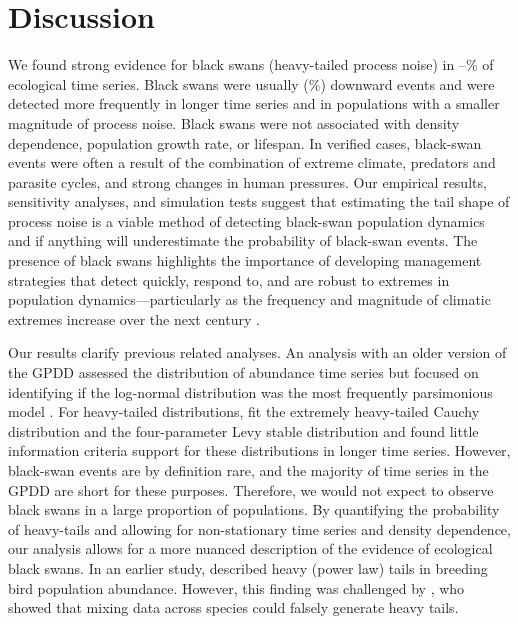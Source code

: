 \section{Discussion}

We found strong evidence for black swans (heavy-tailed process noise) in
\overallMinPerc--\overallMaxPerc\% of ecological time series. Black swans were
usually (\percBSDown \%) downward events and were detected more frequently in
longer time series and in populations with a smaller magnitude of process
noise. Black swans were not associated with density dependence, population
growth rate, or lifespan. In verified cases, black-swan events were often a
result of the combination of extreme climate, predators and parasite cycles,
and strong changes in human pressures. Our empirical results, sensitivity
analyses, and simulation tests suggest that estimating the tail shape of
process noise is a viable method of detecting black-swan population dynamics
and if anything will underestimate the probability of black-swan events. The
presence of black swans highlights the importance of developing management
strategies that detect quickly, respond to, and are robust to extremes in
population dynamics---particularly as the frequency and magnitude of climatic
extremes increase over the next century \citep{easterling2000,ipcc2012}.

Our results clarify previous related analyses. An analysis with an older
version of the GPDD assessed the distribution of abundance time series but
focused on identifying if the log-normal distribution was the most frequently
parsimonious model \citep{halley2002}. For heavy-tailed distributions,
\citet{halley2002} fit the extremely heavy-tailed Cauchy distribution and the
four-parameter Levy stable distribution and found little information criteria
support for these distributions in longer time series. However, black-swan
events are by definition rare, and the majority of time series in the GPDD are
short for these purposes. Therefore, we would not expect to observe black
swans in a large proportion of populations. By quantifying the probability of
heavy-tails and allowing for non-stationary time series and density
dependence, our analysis allows for a more nuanced description of the evidence
of ecological black swans. In an earlier study, \citet{keitt1998} described
heavy (power law) tails in breeding bird population abundance. However, this
finding was challenged by \citet{allen2001}, who showed that mixing data
across species could falsely generate heavy tails.

